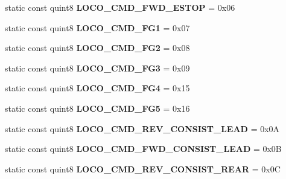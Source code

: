 \begin{DoxyCompactItemize}
\item 
\mbox{\label{class_n_c_e_message_a2b3510ece44ebd78e28ac145daabd12e}} 
static const quint8 {\bfseries L\+O\+C\+O\+\_\+\+C\+M\+D\+\_\+\+F\+W\+D\+\_\+\+E\+S\+T\+OP} = 0x06
\item 
\mbox{\label{class_n_c_e_message_a4d8d329678f7d61c4c4192021209b593}} 
static const quint8 {\bfseries L\+O\+C\+O\+\_\+\+C\+M\+D\+\_\+\+F\+G1} = 0x07
\item 
\mbox{\label{class_n_c_e_message_ac2108206495b2f84392a3114cc517943}} 
static const quint8 {\bfseries L\+O\+C\+O\+\_\+\+C\+M\+D\+\_\+\+F\+G2} = 0x08
\item 
\mbox{\label{class_n_c_e_message_afad6eddcfce7784c1fa185f88ef551c3}} 
static const quint8 {\bfseries L\+O\+C\+O\+\_\+\+C\+M\+D\+\_\+\+F\+G3} = 0x09
\item 
\mbox{\label{class_n_c_e_message_a193b6567f87e9b5f7418359b481d8703}} 
static const quint8 {\bfseries L\+O\+C\+O\+\_\+\+C\+M\+D\+\_\+\+F\+G4} = 0x15
\item 
\mbox{\label{class_n_c_e_message_adf1edd3a38457c80fa48d8db5caf59da}} 
static const quint8 {\bfseries L\+O\+C\+O\+\_\+\+C\+M\+D\+\_\+\+F\+G5} = 0x16
\item 
\mbox{\label{class_n_c_e_message_a1d86984708df5f5a320bd75b7e92d6fa}} 
static const quint8 {\bfseries L\+O\+C\+O\+\_\+\+C\+M\+D\+\_\+\+R\+E\+V\+\_\+\+C\+O\+N\+S\+I\+S\+T\+\_\+\+L\+E\+AD} = 0x0A
\item 
\mbox{\label{class_n_c_e_message_aacda7cc187a0b7e87623f83f74406904}} 
static const quint8 {\bfseries L\+O\+C\+O\+\_\+\+C\+M\+D\+\_\+\+F\+W\+D\+\_\+\+C\+O\+N\+S\+I\+S\+T\+\_\+\+L\+E\+AD} = 0x0B
\item 
\mbox{\label{class_n_c_e_message_a3f36ec6795b300a2d0e32f9e43b23c2a}} 
static const quint8 {\bfseries L\+O\+C\+O\+\_\+\+C\+M\+D\+\_\+\+R\+E\+V\+\_\+\+C\+O\+N\+S\+I\+S\+T\+\_\+\+R\+E\+AR} = 0x0C
\item 
\mbox{\label{class_n_c_e_message_a01f488b90880e9432fab6400baed33d2}} 

\end{DoxyCompactItemize}
